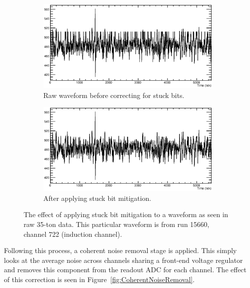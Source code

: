 \begin{figure}
  \centering
  \begin{subfigure}[t]{0.48\linewidth}
    \centering
    \includegraphics[width=\textwidth]{raw_stuck.eps}
    \caption{Raw waveform before correcting for stuck bits.}
    \label{fig:StuckBitWaveformStuck}
  \end{subfigure}
  \hfill
  \begin{subfigure}[t]{0.48\linewidth}
    \centering
    \includegraphics[width=\textwidth]{raw_unstuck.eps}
    \caption{After applying stuck bit mitigation.}
    \label{fig:StuckBitWaveformUnstuck}
  \end{subfigure}
  \caption[The effect of applying stuck bit mitigation to a waveform as seen in raw 35-ton data.]{The effect of applying stuck bit mitigation to a waveform as seen in raw 35-ton data.  This particular waveform is from run 15660, channel 722 (induction channel).}
  \label{fig:StuckBitWaveform}
\end{figure}

Following this process, a coherent noise removal stage is applied.  This simply looks at the average noise across channels sharing a front-end voltage regulator and removes this component from the readout ADC for each channel.  The effect of this correction is seen in Figure~\ref{fig:CoherentNoiseRemoval}.

